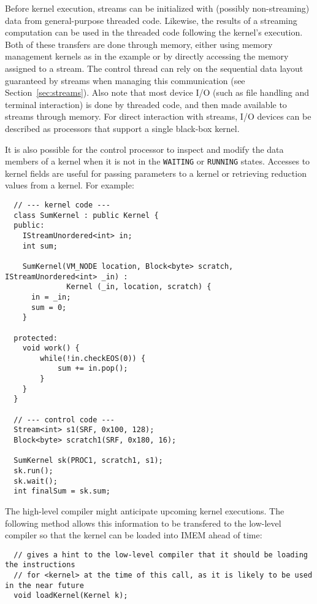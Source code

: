 
Before kernel execution, streams can be initialized with (possibly
non-streaming) data from general-purpose threaded code.  Likewise, the
results of a streaming computation can be used in the threaded code
following the kernel's execution.  Both of these transfers are done
through memory, either using memory management kernels as in the example
 or by directly accessing the memory assigned to a
stream.  The control thread can rely on
the sequential data layout guaranteed by streams when managing this
communication (see Section~\ref{sec:streams}).  Also note that most
device I/O (such as file handling and terminal interaction) is done 
by threaded code, and then made available to streams through memory.  
For direct interaction with streams, I/O devices can be described as 
processors that support a single black-box kernel.

It is also possible for the control processor to inspect and modify
the data members of a kernel when it is not in the 
{\tt WAITING} or {\tt RUNNING}
states. Accesses to kernel fields are useful for passing parameters to a 
kernel or retrieving reduction values from
a kernel.  For example: 

{\small
\begin{verbatim}
  // --- kernel code ---
  class SumKernel : public Kernel {
  public:
    IStreamUnordered<int> in;
    int sum;

    SumKernel(VM_NODE location, Block<byte> scratch, IStreamUnordered<int> _in) : 
              Kernel (_in, location, scratch) {
      in = _in;
      sum = 0;
    }

  protected:
    void work() {
        while(!in.checkEOS(0)) {
            sum += in.pop();
        }
    }
  }

  // --- control code ---
  Stream<int> s1(SRF, 0x100, 128);
  Block<byte> scratch1(SRF, 0x180, 16);

  SumKernel sk(PROC1, scratch1, s1);
  sk.run();
  sk.wait();
  int finalSum = sk.sum;
\end{verbatim}}


The high-level compiler might anticipate upcoming kernel executions.
The following method allows this information to be transfered to the
low-level compiler so that the kernel can be loaded into IMEM ahead of
time:
\begin{verbatim}
  // gives a hint to the low-level compiler that it should be loading the instructions 
  // for <kernel> at the time of this call, as it is likely to be used in the near future
  void loadKernel(Kernel k);
\end{verbatim}

